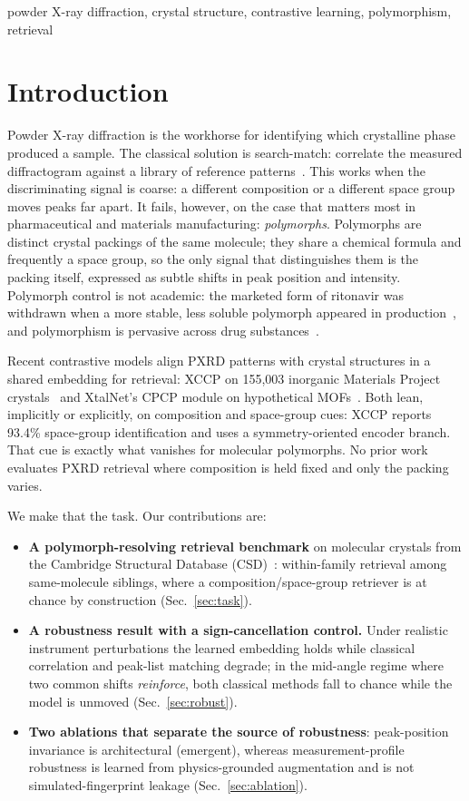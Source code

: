 \documentclass[conference]{IEEEtran}
\begin{document}
\begin{IEEEkeywords}
powder X-ray diffraction, crystal structure, contrastive learning, polymorphism,
retrieval
\end{IEEEkeywords}

\section{Introduction}
Powder X-ray diffraction is the workhorse for identifying which crystalline phase
produced a sample. The classical solution is search-match: correlate the measured
diffractogram against a library of reference patterns~\cite{gatesrector2019pdf}.
This works when the discriminating signal is coarse: a different composition or a
different space group moves peaks far apart. It fails, however, on the case that
matters most in pharmaceutical and materials manufacturing:
\emph{polymorphs}. Polymorphs are distinct crystal packings of the same molecule;
they share a chemical formula and frequently a space group, so the only signal
that distinguishes them is the packing itself, expressed as subtle shifts in peak
position and intensity. Polymorph control is not academic: the marketed form of
ritonavir was withdrawn when a more stable, less soluble polymorph appeared in
production~\cite{bauer2001ritonavir}, and polymorphism is pervasive across drug
substances~\cite{cruzcabeza2015polymorph}.

Recent contrastive models align PXRD patterns with crystal structures in a shared
embedding for retrieval: XCCP on 155{,}003 inorganic Materials Project
crystals~\cite{xu2025xccp} and XtalNet's CPCP module on hypothetical
MOFs~\cite{lai2025xtalnet}. Both lean, implicitly or explicitly, on composition
and space-group cues: XCCP reports 93.4\% space-group identification and uses a
symmetry-oriented encoder branch. That cue is exactly what vanishes for molecular
polymorphs. No prior work evaluates PXRD retrieval where composition is held
fixed and only the packing varies.

We make that the task. Our contributions are:
\begin{itemize}
  \item \textbf{A polymorph-resolving retrieval benchmark} on molecular crystals
  from the Cambridge Structural Database (CSD)~\cite{groom2016csd}: within-family
  retrieval among same-molecule siblings, where a composition/space-group
  retriever is at chance by construction (Sec.~\ref{sec:task}).
  \item \textbf{A robustness result with a sign-cancellation control.} Under
  realistic instrument perturbations the learned embedding holds while classical
  correlation and peak-list matching degrade; in the mid-angle regime where two
  common shifts \emph{reinforce}, both classical methods fall to chance while the
  model is unmoved (Sec.~\ref{sec:robust}).
  \item \textbf{Two ablations that separate the source of robustness}:
  peak-position invariance is architectural (emergent), whereas
  measurement-profile robustness is learned from physics-grounded augmentation
  and is not simulated-fingerprint leakage (Sec.~\ref{sec:ablation}).
\end{itemize}
\end{document}
